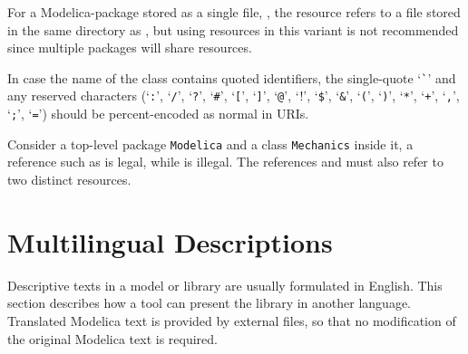 For a Modelica-package stored as a single file, , the resource  refers to a file  stored in the same directory as , but using resources in this variant is not recommended since multiple packages will share resources.

In case the name of the class contains quoted identifiers, the single-quote `\lstinline!`!' and any reserved characters (`\lstinline!:!', `\lstinline!/!', `\lstinline!?!', `\lstinline!#!', `\lstinline![!', `\lstinline!]!', `\lstinline!@!', `\lstinline!!!', `\lstinline[mathescape=false]!$!', `\lstinline!&!', `\lstinline!(!', `\lstinline!)!', `\lstinline!*!', `\lstinline!+!', `\lstinline!,!', `\lstinline!;!', `\lstinline!=!') should be percent-encoded as normal in URIs.

\begin{example}
Consider a top-level package \lstinline!Modelica! and a class \lstinline!Mechanics! inside it, a reference such as  is legal, while  is illegal.
The references  and  must also refer to two distinct resources.
\end{example}


\section{Multilingual Descriptions}\label{multilingual-descriptions}

\begin{nonnormative}
Descriptive texts in a model or library are usually formulated in English.
This section describes how a tool can present the library in another language.
Translated Modelica text is provided by external files, so that no modification of the original Modelica text is required.
\end{nonnormative}

